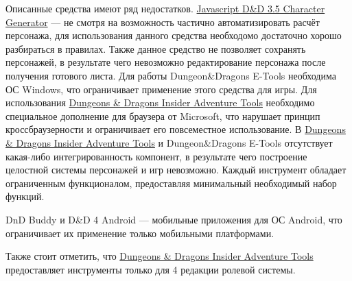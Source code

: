 Описанные средства имеют ряд недостатков.
\href{http://www.pathguy.com/cg35.htm}{Javascript D\&D 3.5 Character Generator} --- не смотря на возможность частично автоматизировать расчёт персонажа, для использования данного средства необходомо достаточно хорошо разбираться в правилах. Также данное средство не позволяет сохранять персонажей, в результате чего невозможно редактирование персонажа после получения готового листа.
Для работы Dungeon\&Dragons E-Tools необходима ОС Windows, что ограничивает применение этого средства для игры.
Для использования \href{http://www.wizards.com/dnd/Tool.aspx?x=dnd/4new/tool/adventuretools}{Dungeons \& Dragons Insider Adventure Tools} необходимо специальное дополнение для браузера от Microsoft, что нарушает принцип кроссбраузерности и ограничивает его повсеместное использование.
В \href{http://www.wizards.com/dnd/Tool.aspx?x=dnd/4new/tool/adventuretools}{Dungeons \& Dragons Insider Adventure Tools} и Dungeon\&Dragons E-Tools отсутствует какая-либо интегрированность компонент, в результате чего построение целостной системы персонажей и игр невозможно. Каждый инструмент обладает ограниченным функционалом, предоставляя минимальный необходимый набор функций.

DnD Buddy и D\&D 4 Android --- мобильные приложения для ОС Android, что ограничивает их применение только мобильными платформами.

Также стоит отметить, что \href{http://www.wizards.com/dnd/Tool.aspx?x=dnd/4new/tool/adventuretools}{Dungeons \& Dragons Insider Adventure Tools} предоставляет инструменты только для 4 редакции ролевой системы.
